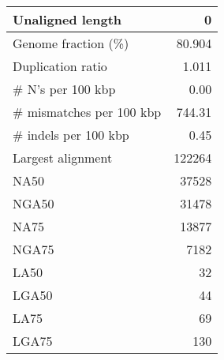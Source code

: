\documentclass[12pt,a4paper]{article}
\begin{document}
\begin{table}[ht]
\begin{center}
\begin{tabular}{|l*{1}{|r}|}
Unaligned length & 0 \\ \hline
Genome fraction (\%) & 80.904 \\ \hline
Duplication ratio & 1.011 \\ \hline
\# N's per 100 kbp & 0.00 \\ \hline
\# mismatches per 100 kbp & 744.31 \\ \hline
\# indels per 100 kbp & 0.45 \\ \hline
Largest alignment & 122264 \\ \hline
NA50 & 37528 \\ \hline
NGA50 & 31478 \\ \hline
NA75 & 13877 \\ \hline
NGA75 & 7182 \\ \hline
LA50 & 32 \\ \hline
LGA50 & 44 \\ \hline
LA75 & 69 \\ \hline
LGA75 & 130 \\ \hline
\end{tabular}
\end{center}
\end{table}
\end{document}
